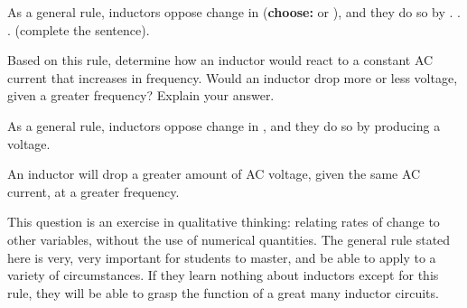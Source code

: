 

As a general rule, inductors oppose change in ({\bf choose:}  or ), and they do so by . . . (complete the sentence).

\vskip 10pt

Based on this rule, determine how an inductor would react to a constant AC current that increases in frequency.  Would an inductor drop more or less voltage, given a greater frequency?  Explain your answer.







As a general rule, inductors oppose change in , and they do so by producing a voltage.

\vskip 10pt

An inductor will drop a greater amount of AC voltage, given the same AC current, at a greater frequency.







This question is an exercise in qualitative thinking: relating rates of change to other variables, without the use of numerical quantities.  The general rule stated here is very, very important for students to master, and be able to apply to a variety of circumstances.  If they learn nothing about inductors except for this rule, they will be able to grasp the function of a great many inductor circuits.





